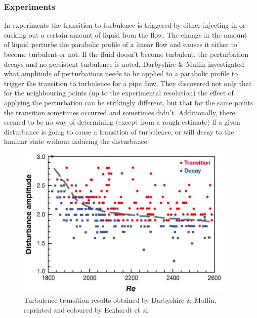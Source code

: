 \documentclass[11pt,a4paper]{article}
\begin{document}
\subsubsection{Experiments}
In experiments the transition to turbulence is triggered by either injecting in or sucking out a certain amount of liquid from the flow.
The change in the amount of liquid perturbs the parabolic profile of a linear flow and causes it either to become turbulent or not.
If the fluid doesn't become turbulent, the perturbation decays and no persistent turbulence is noted.
Darbyshire \& Mullin\cite{Darbyshire95} investigated what amplitude of perturbations needs to be applied to a parabolic profile to trigger the transition to turbulence for a pipe flow.
They discovered not only that for the neighbouring points (up to the experimental resolution) the effect of applying the perturbation can be strikingly different, but that for the same points the transition sometimes occurred and sometimes didn't.
Additionally, there seemed to be no way of determining (except from a rough estimate) if a given disturbance is going to cause a transition of turbulence, or will decay to the laminar state without inducing the disturbance.

\begin{figure}[h!]
    \centering
    \includegraphics[width=0.95\textwidth]{darbyshire95.png}
    \caption{Turbulence transition results obtained by Darbyshire \& Mullin\cite{Darbyshire95}, reprinted and coloured by Eckhardt et al.\cite{Eckhardt07}}\label{img:darbyshire_plot}
\end{figure}
\end{document}
